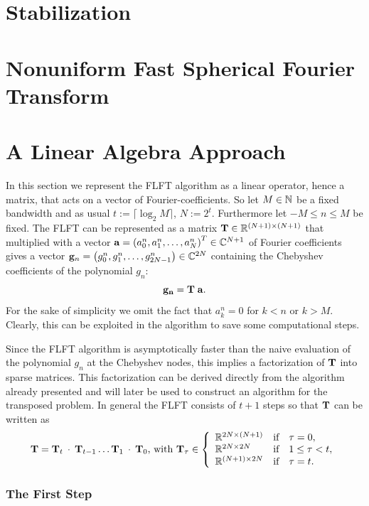 \section{Stabilization}
\label{DSFT:Stabilization}

\section{Nonuniform Fast Spherical Fourier Transform}
\label{DSFT:NFSFT}

\section{A Linear Algebra Approach}
\label{DSFT:LinearAlgebra}

In this section we represent the FLFT algorithm as a linear operator, hence a matrix, that acts on a vector of Fourier-coefficients. So let $M \in \mathbb{N}$ be a fixed bandwidth and as usual $t := \lceil\log_2{M}\rceil$, $N := 2^t$. Furthermore let  $-M \le n \le M$ be fixed. The FLFT can be represented as a matrix $\mathbf{T} \in \mathbb{R}^{(N+1) \times (N+1)}$ that multiplied with a vector $\mathbf{a} = \left(a_0^n,a_1^n,\dots,a_N^n\right)^T \in \mathbb{C}^{N+1}$ of Fourier coefficients gives a vector $\mathbf{g}_n = \left(g_0^n,g_1^n,\dots,g_{2N-1}^n\right) \in \mathbb{C}^{2N}$ containing the Chebyshev coefficients of the polynomial $g_n$: $$\mathbf{g_{n}} = \mathbf{T} \; \mathbf{a}.$$ For the sake of simplicity we omit the fact that $a_{k}^n = 0$ for $k < n$ or $k > M$. Clearly, this can be exploited in the algorithm to save some computational steps.

Since the FLFT algorithm is asymptotically faster than the naive evaluation of the polynomial $g_{n}$ at the Chebyshev nodes, this implies a factorization of $\mathbf{T}$ into sparse matrices. This factorization can be derived directly from the algorithm already presented and will later be used to construct an algorithm for the transposed problem. In general the FLFT consists of $t+1$ steps so that $\mathbf{T}$ can be written as $$\mb{T} = \mb{T}_{t} \: \cdot \:  \mb{T}_{t-1} \dots \mb{T}_{1} \: \cdot \:  \mb{T}_{0} \text{, with } \mb{T}_{\tau} \in \left\{\begin{array}{l@{\quad \text{if} \quad}l} \R^{2N \times (N+1)} & \tau = 0, \\ \R^{2N \times 2N} & 1 \le \tau < t, \\ \R^{(N+1) \times 2N} & \tau = t. \end{array}\right.$$

\subsubsection{The First Step}

